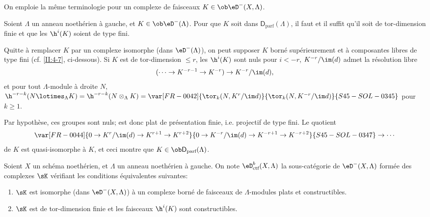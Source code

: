 On emploie la même terminologie pour un complexe de faisceaux 
$K\in\ob\eD^-(X,\Lambda)$. 





\begin{lemma}\label{II:4-5-1} 
Soient $\Lambda$ un anneau noethérien à gauche, et $K\in\ob\eD^-(\Lambda)$. 
Pour que $K$ soit dans $\mathsf{D}_\text{parf}(\Lambda)$, il faut et il suffit 
qu'il soit de tor-dimension finie et que les $\h^i(K)$ soient de type fini.
\end{lemma}

Quitte à remplacer $K$ par un complexe isomorphe (dans $\eD^-(\Lambda)$), on 
peut supposer $K$ borné supérieurement et à composantes libres de type 
fini (cf. \ref{II:4-7}, ci-dessous). Si $K$ est de tor-dimension $\leqslant r$, 
les $\h^i(K)$ sont nuls pour $i<-r$, $K^{-r}/\im(d)$ admet la résolution 
libre 
\[
  (\cdots \to K^{-r-1} \to K^{-r}) \to K^{-r}/\im(d) \text{,}
\]
et pour tout $\Lambda$-module à droite $N$, 
$\h^{-r-k}(N\lotimes_\Lambda K) = \h^{-r-k}(N\otimes_\Lambda K) 
= \var[FR-0042]{\tor_k(N,K^r/\im d)}{\tor_k(N,K^{-r}/\im d)}{S45-SOL-0345}$ pour $k\geqslant 1$. 

Par hypothèse, ces groupes sont nuls;  est donc plat de 
présentation finie, i.e. projectif de type fini. Le quotient 
\[
  \var[FR-0044]{0 \to K^r/\im(d) \to K^{r+1} \to K^{r+2}}{0 \to K^{-r}/\im(d) \to K^{-r+1} \to K^{-r+2}}{S45-SOL-0347}\to \cdots 
\]
de $K$ est quasi-isomorphe à $K$, et ceci montre que 
$K\in\ob\mathsf{D}_\text{parf}(\Lambda)$. 





\begin{prop-def_}\label{II:4-6}
Soient $X$ un schéma noethérien, et $\Lambda$ un anneau noethérien à 
gauche. On note $\eD_\textnormal{ctf}^b(X,\Lambda)$ la sous-catégorie de 
$\eD^-(X,\Lambda)$ formée des complexes $\sK$ vérifiant les conditions 
équivalentes suivantes:
\begin{enumerate}[\indent i)]
  \item $\sK$ est isomorphe (dans $\eD^-(X,\Lambda)$) à un complexe borné de 
    faisceaux de $\Lambda$-modules plats et constructibles. 
  \item $\sK$ est de tor-dimension finie et les faisceaux $\h^i(K)$ sont 
    constructibles. 
\end{enumerate}
\end{prop-def_}

